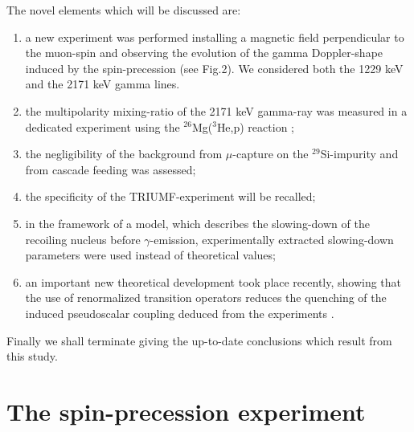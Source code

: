 The novel elements which will be discussed are:
\begin{enumerate}
\item a new experiment was performed installing a magnetic field
perpendicular to the muon-spin and observing the evolution of the gamma
Doppler-shape induced by the spin-precession (see Fig.2).
We considered both the 1229 keV and the 2171 keV gamma lines.
\item the multipolarity mixing-ratio of the 2171 keV gamma-ray was
measured in a dedicated experiment using the 
$^{26}$Mg($^3$He,p) reaction \cite{Kudoyarov96};
\item the negligibility of the background from $\mu$-capture on
the $^{29}$Si-impurity and from cascade feeding was assessed;
\item the specificity of the TRIUMF-experiment \cite{Moftah97} will be
recalled;
\item in the framework of  a model, which describes the slowing-down
of the recoiling nucleus before $\gamma$-emission,
experimentally extracted slowing-down parameters were used
instead of theoretical values;
\item an important new theoretical development took  place
recently, showing that the use of renormalized transition operators
reduces
the quenching of the induced pseudoscalar coupling 
deduced from the experiments \cite{Siiskonen98}.
\end{enumerate}
        Finally we shall terminate giving the up-to-date conclusions
which
result from this study.

\section{The spin-precession experiment}


